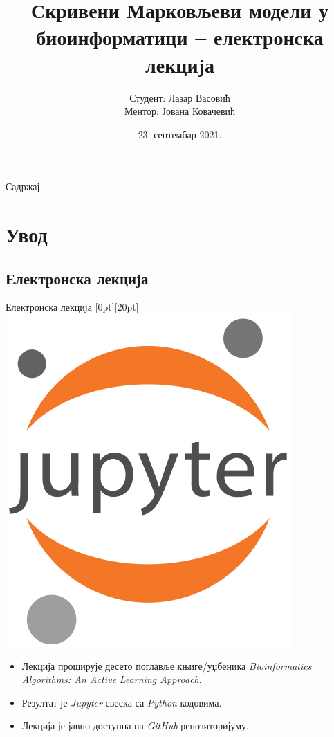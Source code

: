 \documentclass[hyperref={bookmarks=false}]{beamer}
\title[\textit{HMM} у биоинформатици]{Скривени Марковљеви модели у биоинформатици -- електронска лекција}
\author[Лазар Васовић]{Студент: Лазар Васовић\\ Ментор: Јована Ковачевић}
\date[Математички факултет]{23. септембар 2021.}
\newcommand{\lenitem}[2][.43\linewidth]{\parbox[t]{#1}{\strut #2\strut}}
\begin{document}
\frame{\titlepage}

\begin{frame}{Садржај}
\tableofcontents[subsectionstyle=hide]
\end{frame}

\section{Увод}
\subsection{Електронска лекција}
\begin{frame}{Електронска лекција}
\mbox{}\hfill\raisebox{-\height}[0pt][20pt]{\includegraphics[width=.35\linewidth]{jupyter.png}}
\vspace*{-\baselineskip}

\begin{itemize}
\item \lenitem{Лекција проширује десето поглавље књиге/уџбеника \textit{Bioinformatics Algorithms: An Active Learning Approach}.}
\item \lenitem{Резултат је \textit{Jupyter} свеска са \textit{Python} кодовима.}
\item \lenitem{Лекција је јавно доступна на \textit{GitHub} репозиторијуму.}
\end{itemize}
\end{frame}
\end{document}
